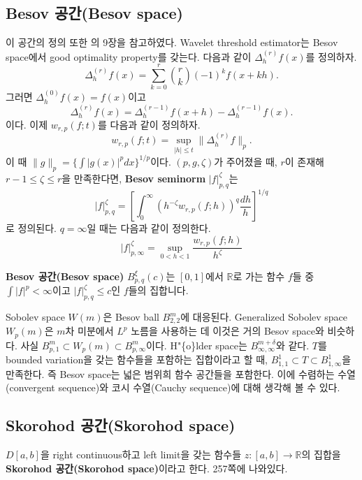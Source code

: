 \documentclass[b5paper,]{scrbook}
\theoremstyle{plain}
\theoremstyle{definition}
\numberwithin{equation}{section}
\let\BeginKnitrBlock\begin \let\EndKnitrBlock\end
\begin{document}
\subsection{Besov 공간(Besov space)}\label{besov-besov-space}

이 공간의 정의 또한 \citep{Wasserman2006}의 9장을 참고하였다. Wavelet
threshold estimator는 Besov space에서 good optimality property를 갖는다.
다음과 같이 \(\Delta_{h}^{(r)}f(x)\)를 정의하자.
\[\Delta_{h}^{(r)}f(x)=\sum_{k=0}^{r}\binom{r}{k}(-1)^{k}f(x+kh).\]
그러면 \(\Delta_{h}^{(0)}f(x)=f(x)\)이고
\[\Delta_{h}^{(r)}f(x)=\Delta_{h}^{(r-1)}f(x+h)-\Delta_{h}^{(r-1)}f(x).\]
이다. 이제 \(w_{r,p}(f;t)\)를 다음과 같이 정의하자.
\[w_{r,p}(f;t)=\sup_{|h|\leq t}\|\Delta_{h}^{(r)}f\|_{p}.\] 이 때
\(\|g\|_{p}=\{ \int |g(x)|^{p}dx \}^{1/p}\)이다. \((p,g,\zeta)\)가
주어졌을 때, \(r\)이 존재해 \(r-1\leq \zeta \leq r\)을 만족한다면,
\textbf{Besov seminorm} \(|f|_{p,q}^{\zeta}\)는
\[|f|_{p,q}^{\zeta}=[\int_{0}^{\infty}(h^{-\zeta}w_{r,p}(f;h))^{q}\frac{dh}{h}]^{1/q}\]
로 정의된다. \(q=\infty\)일 때는 다음과 같이 정의한다.
\[|f|_{p,\infty}^{\zeta}=\sup_{0<h<1}\frac{w_{r,p}(f;h)}{h^{\zeta}}\]

\BeginKnitrBlock{definition}[Besov 공간]
\protect\hypertarget{def:unnamed-chunk-19}{}{\label{def:unnamed-chunk-19}
{} }\textbf{Besov 공간(Besov space)}
\(B_{p,q}^{\xi}(c)\)는 \([0,1]\)에서 \(\mathbb{R}\)로 가는 함수 \(f\)들
중 \(\int |f|^{p}<\infty\)이고 \(|f|_{p,q}^{\zeta}\leq c\)인 \(f\)들의
집합니다.
\EndKnitrBlock{definition}

Sobolev space \(W(m)\)은 Besov ball \(B_{2,2}^{m}\)에 대응된다.
Generalized Sobolev space \(W_{p}(m)\)은 \(m\)차 미분에서 \(L^{p}\)
노름을 사용하는 데 이것은 거의 Besov space와 비슷하다. 사실
\(B_{p,1}^{m} \subset W_{p}(m) \subset B_{p,\infty}^{m}\)이다.
H"\{o\}lder space는 \(B_{\infty,\infty}^{m+\delta}\)와 같다. \(T\)를
bounded variation을 갖는 함수들을 포함하는 집합이라고 할 때,
\(B_{1,1}^{1}\subset T \subset B_{1,\infty}^{1}\)을 만족한다. 즉 Besov
space는 넓은 범위희 함수 공간들을 포함한다. 이에 수렴하는
수열(convergent sequence)와 코시 수열(Cauchy sequence)에 대해 생각해 볼
수 있다.

\subsection{Skorohod 공간(Skorohod
space)}\label{skorohod-skorohod-space}

\(D[a,b]\)을 right continuous하고 left limit을 갖는 함수들
\(z:[a,b]\rightarrow \mathbb{R}\)의 집합을 \textbf{Skorohod
공간(Skorohod space)}이라고 한다. \citep{VanderVaart2000} 257쪽에
나와있다.
\end{document}
